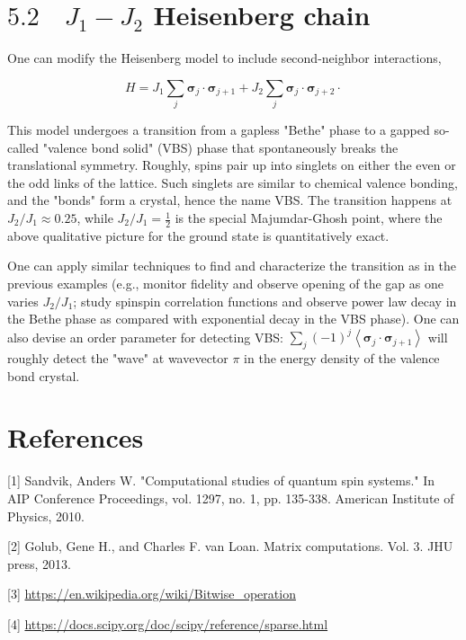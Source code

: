 \documentclass[12pt]{article}
\begin{document}
\section*{$5.2 \quad J_{1}-J_{2}$ Heisenberg chain}
One can modify the Heisenberg model to include second-neighbor interactions,


\begin{equation*}
H=J_{1} \sum_{j} \boldsymbol{\sigma}_{j} \cdot \boldsymbol{\sigma}_{j+1}+J_{2} \sum_{j} \boldsymbol{\sigma}_{j} \cdot \boldsymbol{\sigma}_{j+2} \cdot \tag{15}
\end{equation*}


This model undergoes a transition from a gapless "Bethe" phase to a gapped so-called "valence bond solid" (VBS) phase that spontaneously breaks the translational symmetry. Roughly, spins pair up into singlets on either the even or the odd links of the lattice. Such singlets are similar to chemical valence bonding, and the "bonds" form a crystal, hence the name VBS. The transition happens at $J_{2} / J_{1} \approx 0.25$, while $J_{2} / J_{1}=\frac{1}{2}$ is the special Majumdar-Ghosh point, where the above qualitative picture for the ground state is quantitatively exact.

One can apply similar techniques to find and characterize the transition as in the previous examples (e.g., monitor fidelity and observe opening of the gap as one varies $J_{2} / J_{1}$; study spinspin correlation functions and observe power law decay in the Bethe phase as compared with exponential decay in the VBS phase). One can also devise an order parameter for detecting VBS: $\sum_{j}(-1)^{j}\left\langle\boldsymbol{\sigma}_{j} \cdot \boldsymbol{\sigma}_{j+1}\right\rangle$ will roughly detect the "wave" at wavevector $\pi$ in the energy density of the valence bond crystal.

\section*{References}
[1] Sandvik, Anders W. "Computational studies of quantum spin systems." In AIP Conference Proceedings, vol. 1297, no. 1, pp. 135-338. American Institute of Physics, 2010.

[2] Golub, Gene H., and Charles F. van Loan. Matrix computations. Vol. 3. JHU press, 2013.

[3] \href{https://en.wikipedia.org/wiki/Bitwise_operation}{https://en.wikipedia.org/wiki/Bitwise\_operation}

[4] \href{https://docs.scipy.org/doc/scipy/reference/sparse.html}{https://docs.scipy.org/doc/scipy/reference/sparse.html}
\end{document}
